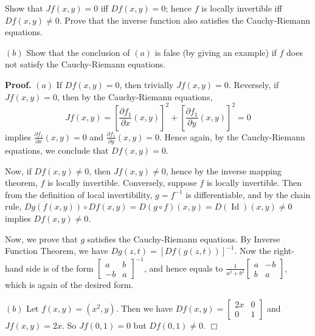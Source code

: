 \documentclass{article}
\begin{document}
Show that $Jf (x, y) = 0$ iff $Df (x, y) = 0$; hence $f$ is locally
invertible iff $Df (x, y) \neq 0$. Prove that the inverse function also
satisfies the Cauchy-Riemann equations.

$(b)$ Show that the conclusion of $(a)$ is false (by giving an example)
if $f$ does not satisfy the Cauchy-Riemann equations.

    \textbf{Proof.} $(a)$ If $Df(x,y) = 0$, then trivially $Jf(x,y) = 0$.
Reversely, if $Jf(x,y) = 0$, then by the Cauchy-Riemann equations,
\[Jf(x,y) = \left[\frac{\partial f_1}{\partial x}(x,y)\right]^2 +  \left[\frac{\partial f_1}{\partial y}(x,y)\right]^2 = 0\]
implies $\frac{\partial f_1}{\partial x}(x,y)=0$ and
$\frac{\partial f_1}{\partial y}(x,y)=0$. Hence again, by the
Cauchy-Riemann equations, we conclude that $Df(x,y) = 0$.

Now, if $Df (x, y) \neq 0$, then $Jf(x,y) \ne 0$, hence by the inverse
mapping theorem, $f$ is locally invertible. Conversely, suppose $f$ is
locally invertible. Then from the definition of local invertibility,
$g=f^{-1}$ is differentiable, and by the chain rule,
$Dg(f(x,y)) \circ Df(x,y) = D(g\circ f)(x,y) = D(\operatorname{Id})(x,y) \ne 0$
implies $Df(x,y) \ne 0$.

Now, we prove that $g$ satisfies the Cauchy-Riemann equations. By
Inverse Function Theorem, we have $Dg(z, t) = [Df(g(z, t))]^{-1}$. Now
the right-hand side is of the form
$\begin{bmatrix}a & b \\ -b & a\end{bmatrix}^{-1}$, and hence equals to
$\frac{1}{a^2+b^2}\begin{bmatrix}a & -b \\ b & a\end{bmatrix}$, which is
again of the desired form.

$(b)$ Let $f(x,y) = (x^2,y)$. Then we have
$Df(x,y) = \begin{bmatrix}2x & 0 \\ 0 & 1\end{bmatrix}$ and
$Jf(x,y) = 2x$. So $Jf(0,1) = 0$ but $Df(0,1) \ne 0$. $\Box$


    
    
    
    
\end{document}
